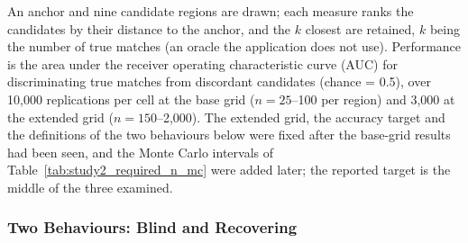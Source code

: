 \documentclass[AMA,Times1COL]{WileyNJDv5}
\begin{document}
An anchor and nine candidate regions are drawn; each measure ranks the candidates by their distance to the anchor, and the $k$ closest are retained, $k$ being the number of true matches (an oracle the application does not use). Performance is the area under the receiver operating characteristic curve (AUC) for discriminating true matches from discordant candidates (chance = 0.5), over 10{,}000 replications per cell at the base grid ($n = 25$--100 per region) and 3{,}000 at the extended grid ($n = 150$--2{,}000). The extended grid, the accuracy target and the definitions of the two behaviours below were fixed after the base-grid results had been seen, and the Monte Carlo intervals of Table~\ref{tab:study2_required_n_mc} were added later; the reported target is the middle of the three examined.

\subsubsection{Two Behaviours: Blind and Recovering}\label{sec:study1_classification}
\end{document}
